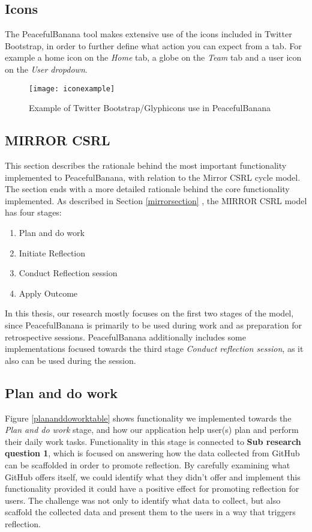 \subsection{Icons}
The PeacefulBanana tool makes extensive use of the icons included in Twitter Bootstrap, in order to further define what action you can expect from a tab. For example a home icon on the \textit{Home} tab, a globe on the \textit{Team} tab and a user icon on the \textit{User dropdown}.
\begin{figure}[H]
\centering
	\texttt{[image: iconexample]}
\caption{Example of Twitter Bootstrap/Glyphicons use in PeacefulBanana \citep{twitterbootstrap}}
\label{iconexample}
\end{figure}

\subsection{MIRROR CSRL}
This section describes the rationale behind the most important functionality implemented to PeacefulBanana, with relation to the Mirror CSRL cycle model. The section ends with a more detailed rationale behind the core functionality implemented. As described in Section \ref{mirrorsection} , the MIRROR CSRL model has four stages: 
\begin{enumerate}
    \item Plan and do work
    \item Initiate Reflection
    \item Conduct Reflection session
    \item Apply Outcome
\end{enumerate}
In this thesis, our research mostly focuses on the first two stages of the model, since PeacefulBanana is primarily to be used during work and as preparation for retrospective sessions. PeacefulBanana additionally includes some implementations focused towards the third stage \emph{Conduct reflection session}, as it also can be used during the session. 

\subsection{Plan and do work}
Figure \ref{plananddoworktable} shows functionality we implemented towards the \emph{Plan and do work} stage, and how our application help user(s) plan and perform their daily work tasks. 
Functionality in this stage is connected to \textbf{Sub research question 1}, which is focused on answering how the data collected from GitHub can be scaffolded in order to promote reflection. By carefully examining what GitHub offers itself, we could identify what they didn't offer and implement this functionality provided it could have a positive effect for promoting reflection for users. The challenge was not only to identify what data to collect, but also scaffold the collected data and present them to the users in a way that triggers reflection. 

